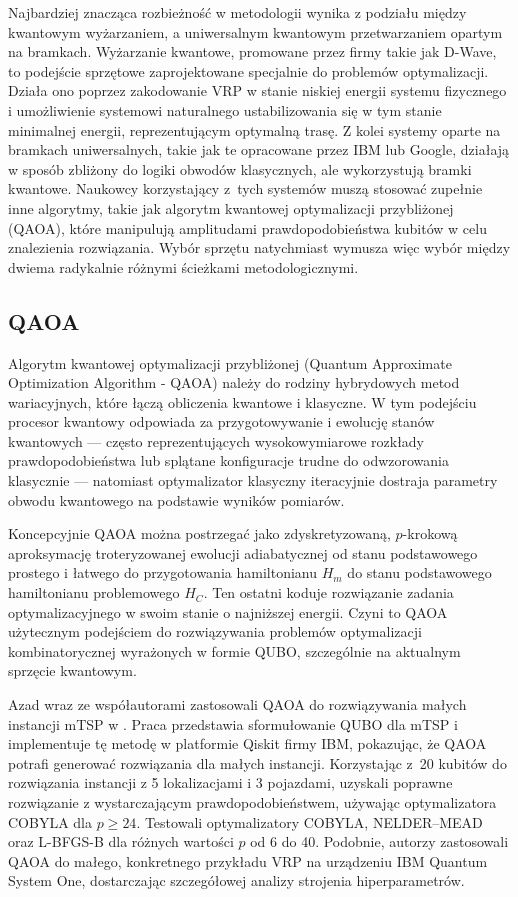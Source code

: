 Najbardziej znacząca rozbieżność w metodologii wynika z podziału między kwantowym wyżarzaniem, a uniwersalnym kwantowym przetwarzaniem opartym na bramkach. Wyżarzanie kwantowe, promowane przez firmy takie jak D-Wave, to podejście sprzętowe zaprojektowane specjalnie do problemów optymalizacji. Działa ono poprzez zakodowanie VRP w stanie niskiej energii systemu fizycznego i umożliwienie systemowi naturalnego ustabilizowania się w tym stanie minimalnej energii, reprezentującym optymalną trasę. Z kolei systemy oparte na bramkach uniwersalnych, takie jak te opracowane przez IBM lub Google, działają w sposób zbliżony do logiki obwodów klasycznych, ale wykorzystują bramki kwantowe. Naukowcy korzystający z~tych systemów muszą stosować zupełnie inne algorytmy, takie jak algorytm kwantowej optymalizacji przybliżonej (QAOA), które manipulują amplitudami prawdopodobieństwa kubitów w celu znalezienia rozwiązania. Wybór sprzętu natychmiast wymusza więc wybór między dwiema radykalnie różnymi ścieżkami metodologicznymi.

\subsection{QAOA}
Algorytm kwantowej optymalizacji przybliżonej (Quantum Approximate Optimization Algorithm - QAOA) \cite{farhi2014quantumapproximateoptimizationalgorithm} należy do rodziny hybrydowych metod wariacyjnych, które łączą obliczenia kwantowe i klasyczne. W tym podejściu procesor kwantowy odpowiada za przygotowywanie i ewolucję stanów kwantowych — często reprezentujących wysokowymiarowe rozkłady prawdopodobieństwa lub splątane konfiguracje trudne do odwzorowania klasycznie — natomiast optymalizator klasyczny iteracyjnie dostraja parametry obwodu kwantowego na podstawie wyników pomiarów.

Koncepcyjnie QAOA można postrzegać jako zdyskretyzowaną, $p$-krokową aproksymację troteryzowanej ewolucji adiabatycznej od stanu podstawowego prostego i łatwego do przygotowania hamiltonianu $H_m$ do stanu podstawowego hamiltonianu problemowego $H_C$. Ten ostatni koduje rozwiązanie zadania optymalizacyjnego w swoim stanie o najniższej energii. Czyni to QAOA użytecznym podejściem do rozwiązywania problemów optymalizacji kombinatorycznej wyrażonych w formie QUBO, szczególnie na aktualnym sprzęcie kwantowym.

Azad wraz ze współautorami zastosowali QAOA do rozwiązywania małych instancji mTSP w \cite{Azad_2023}. Praca przedstawia sformułowanie QUBO dla mTSP i implementuje tę metodę w platformie Qiskit firmy IBM, pokazując, że QAOA potrafi generować rozwiązania dla małych instancji. Korzystając z~20 kubitów do rozwiązania instancji z 5 lokalizacjami i 3 pojazdami, uzyskali poprawne rozwiązanie z wystarczającym prawdopodobieństwem, używając optymalizatora COBYLA dla $p \ge 24$. Testowali optymalizatory COBYLA, NELDER–MEAD oraz L-BFGS-B dla różnych wartości $p$ od 6 do 40. Podobnie, autorzy \cite{azfar2025quantumassistedvehicleroutingrealizing} zastosowali QAOA do małego, konkretnego przykładu VRP na urządzeniu IBM Quantum System One, dostarczając szczegółowej analizy strojenia hiperparametrów.

